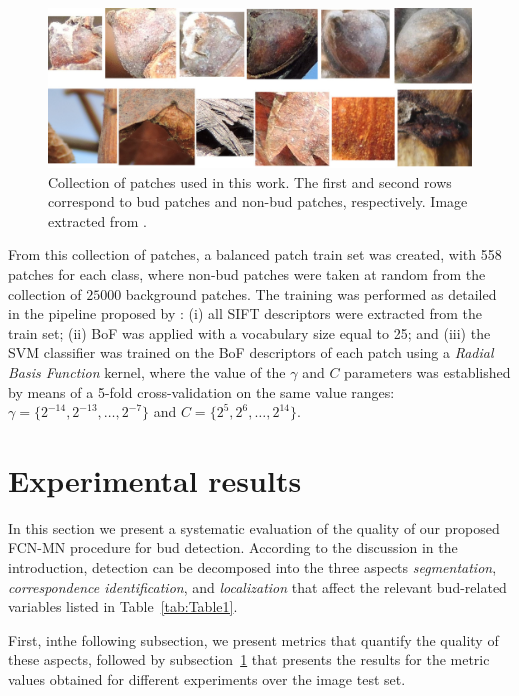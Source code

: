 \documentclass[a4paper,authoryear,review]{elsarticle}
\begin{document}
	
	\begin{figure}
		\centering
		\includegraphics[width=12cm]{figures/Figure2.png}
		\caption{
			Collection of patches used in this work. The first and second rows correspond to bud patches and non-bud patches, respectively. Image extracted from \citet{perez2017image}.
		}
		\label{fig:Figure2}
	\end{figure}
	
	
	From this collection of patches, a balanced patch train set was created, with 558 patches for  each class, where non-bud patches were taken at random from the collection of $25000$ background patches. The training was performed as detailed in the pipeline proposed by \citet{perez2017image}: (i) all SIFT descriptors were extracted from the train set; (ii) BoF was applied with a vocabulary size equal to 25; and (iii) the SVM classifier was trained on the BoF descriptors of each patch using a \emph{Radial Basis Function} kernel, where the value of the $\gamma$ and $C$ parameters was established by means of a 5-fold cross-validation on the same value ranges: $\gamma = \{2^{-14}, 2^{-13}, \ldots, 2^{-7}\}$ and $C = \{2^{5}, 2^{6},\ldots , 2^{14}\}$.
	
	\section{Experimental results} 
	\label{sec:results}
	
	In this section we present a systematic evaluation of the quality of our proposed FCN-MN procedure for bud detection. According to the discussion in the introduction, detection can be decomposed into the three aspects \emph{segmentation}, \emph{correspondence identification}, and \emph{localization} that affect the relevant bud-related variables listed in Table~\ref{tab:Table1}. 
	
	First, inthe following subsection, we present metrics that quantify the quality of these aspects, followed by subsection~\ref{sec:results} that presents the results for the metric values obtained for different experiments over the image test set. 
	
\end{document}
